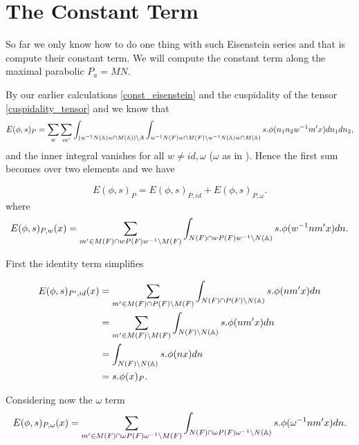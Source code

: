 \section{The Constant Term}
So far we only know how to do one thing with such Eisenstein series and that is compute their constant term.  We will compute the constant term along the maximal parabolic \(P_a = MN\). 

By our earlier calculations \ref{const_eisenstein} and the cuspidality of the tensor \ref{cuspidality_tensor} and \cite{jiangPolesCertainResidual2013} we know that 
     \[E(\phi, s)_{P} = \sum_{ w} \sum_{m'} \int_{(w\inv N(\A)w \cap M(\A)) \setminus A} \int_{w\inv N(F) w \cap M(F) \setminus w\inv N(\A)w \cap M(\A)} s.\phi( n_1 n_2 w\inv m' x)  dn_1 dn_2,\] 
     and the inner integral vanishes for all \(w\neq id, \omega\) (\(\omega\) as in \cite{jiangPolesCertainResidual2013}). Hence the first sum becomes over two elements and we have 

     \[E(\phi, s)_{P} = E(\phi, s)_{P, id} + E(\phi, s)_{P, \omega}.\]
     where 
     \[E(\phi, s)_{P, w}(x) =  \sum_{m'\in M(F)\cap wP(F)w\inv\setminus M(F)} \int_{N(F)\cap wP(F)w\inv \setminus N(\A)} s.\phi( w\inv nm' x)  dn.\]

First the identity term simplifies

     \begin{equation*}
        \begin{aligned}
            E(\phi, s)_{P', id} (x)&=  \sum_{m'\in M(F)\cap P(F)\setminus M(F)} \int_{N(F)\cap P(F) \setminus N(\A)} s.\phi( nm' x)  dn\\
            &= \sum_{m'\in M(F)\setminus M(F)} \int_{N(F)\setminus N(\A)} s.\phi( nm' x)  dn \\
            &=\int_{N(F)\setminus N(\A)} s.\phi( n x)  dn \\
            &= s.\phi(x)_P.
        \end{aligned}
     \end{equation*}

     Considering now the \(\omega\) term 
     \[E(\phi, s)_{P, \omega}(x) =  \sum_{m'\in M(F)\cap \omega P(F)\omega\inv\setminus M(F)} \int_{N(F)\cap \omega P(F)\omega\inv \setminus N(\A)} s.\phi( \omega\inv nm' x)  dn.\]


